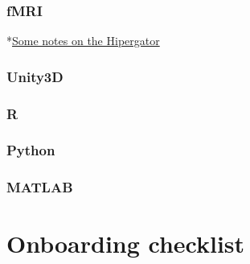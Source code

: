 \documentclass[
  12pt,
]{book}
\begin{document}
\hypertarget{fmri-1}{%
\subsection{fMRI}\label{fmri-1}}

*\href{hipergator_notes.md}{Some notes on the Hipergator}

\hypertarget{unity3d}{%
\subsection{Unity3D}\label{unity3d}}

\hypertarget{r}{%
\subsection{R}\label{r}}

\hypertarget{python}{%
\subsection{Python}\label{python}}

\hypertarget{matlab}{%
\subsection{MATLAB}\label{matlab}}

\hypertarget{onboarding}{%
\chapter{Onboarding checklist}\label{onboarding}}

  
\end{document}
